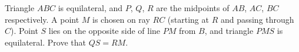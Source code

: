 Triangle $ABC$ is equilateral, and $P$, $Q$, $R$ are the midpoints of $AB$, $AC$, $BC$ respectively. A point $M$ is chosen on ray $RC$ (starting at $R$ and passing through $C$). Point $S$ lies on the opposite side of line $PM$ from $B$, and triangle $PMS$ is equilateral. Prove that $QS=RM$.
